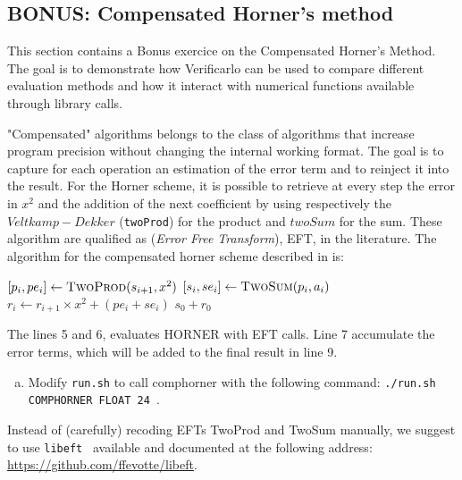 \subsection{BONUS: Compensated Horner's method}
This section contains a Bonus exercice on the Compensated Horner's Method.
The goal is to demonstrate how Verificarlo can be used to compare different evaluation methods and how it interact with numerical functions available through library calls.
 

"Compensated" algorithms belongs to the class of algorithms that increase
program precision without changing the internal working format. 
The goal is to capture for each operation an estimation of the error term and to reinject it into the result.
For the Horner scheme, it is possible to retrieve at every step the error in
$x^2$ and the addition of the next coefficient by using respectively the
$Veltkamp-Dekker$ ({\tt twoProd}) for the product and $twoSum$ for the sum.
These algorithm are qualified as ({\it Error Free Transform}), EFT, in the
literature. 
The algorithm for the compensated horner scheme described in \cite{graillat2005compensated} is:

\begin{algorithmic}[1]
       \State $[p_i, pe_i] \gets \text{\sc TwoProd}(s_{i+1}, x^2)$
       \State $[s_i, se_i] \gets \text{\sc TwoSum}(p_i, a_i)$
       \State $r_i \gets r_{i+1}\times x^2+(pe_i+se_i)$
    \EndFor
    \State \Return $s_0 + r_0$
  \EndProcedure
\end{algorithmic}

The lines 5 and 6, evaluates HORNER with EFT calls. Line 7 accumulate the error terms, which will be added to the final result in line 9.

\begin{question}
  \begin{enumerate}[(a)]
    \item Modify {\tt run.sh} to call comphorner with the following command: {\tt ./run.sh COMPHORNER FLOAT 24 }.
  \end{enumerate}
\end{question}

Instead of (carefully) recoding EFTs {\sc TwoProd} and {\sc TwoSum} manually, we suggest to use {\tt libeft}~\cite{libeft} available and documented at the following address: \url{https://github.com/ffevotte/libeft}.

